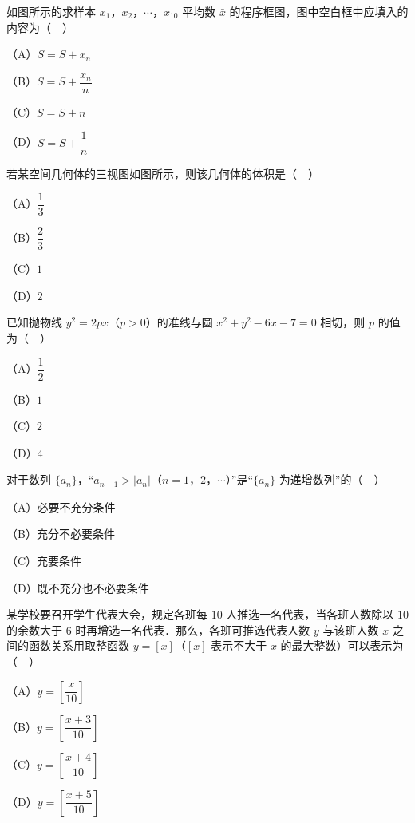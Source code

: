 \begingroup
\renewenvironment{question}{\Needspace{0.5\textheight}}{}
\begin{question}
如图所示的求样本 $x_1$，$x_2$，$\cdots$，$x_{10}$ 平均数 $\bar x$ 的程序框图，图中空白框中应填入的内容为（　）

（A）$S=S+x_n$

（B）$S=S+\dfrac{x_n}{n}$

（C）$S=S+n$

（D）$S=S+\dfrac1n$
\nopagebreak[4]
\begin{center}\end{center}
\nopagebreak[4]
\Needspace{0.4\textheight}
\end{question}
\endgroup
\begingroup
\renewenvironment{question}{\Needspace{0.5\textheight}}{}
\begin{question}
若某空间几何体的三视图如图所示，则该几何体的体积是（　）

（A）$\dfrac13$

（B）$\dfrac23$

（C）$1$

（D）$2$
\nopagebreak[4]
\begin{center}\end{center}
\nopagebreak[4]
\end{question}
\endgroup
\begin{question}
已知抛物线 $y^2=2px$（$p>0$）的准线与圆 $x^2+y^2-6x-7=0$ 相切，则 $p$ 的值为（　）

（A）$\dfrac12$

（B）$1$

（C）$2$

（D）$4$

\end{question}
\begin{question}
对于数列 $\{a_n\}$，“$a_{n+1}>|a_n|$（$n=1$，$2$，$\cdots$）”是“$\{a_n\}$ 为递增数列”的（　）

（A）必要不充分条件

（B）充分不必要条件

（C）充要条件

（D）既不充分也不必要条件

\end{question}
\begin{question}
某学校要召开学生代表大会，规定各班每 $10$ 人推选一名代表，当各班人数除以 $10$ 的余数大于 $6$ 时再增选一名代表．那么，各班可推选代表人数 $y$ 与该班人数 $x$ 之间的函数关系用取整函数 $y=[x]$（$[x]$ 表示不大于 $x$ 的最大整数）可以表示为（　）

（A）$y=\left[\dfrac{x}{10}\right]$

（B）$y=\left[\dfrac{x+3}{10}\right]$

（C）$y=\left[\dfrac{x+4}{10}\right]$

（D）$y=\left[\dfrac{x+5}{10}\right]$

\end{question}

